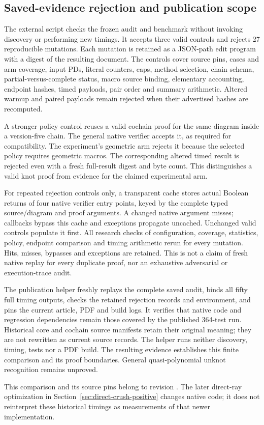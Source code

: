 \subsection{Saved-evidence rejection and publication scope}

The external script 
checks the frozen audit and benchmark without invoking discovery or
performing new timings.  It accepts three valid controls and rejects
27 reproducible mutations.  Each mutation is retained as a JSON-path
edit program with a digest of the resulting document.  The controls
cover source pins, cases and arm coverage, input PDs, literal counters,
caps, method selection, chain schema, partial-versus-complete status,
macro source binding, elementary accounting, endpoint hashes, timed
payloads, pair order and summary arithmetic.  Altered warmup and paired
payloads remain rejected when their advertised hashes are recomputed.

A stronger policy control reuses a valid cochain proof for the same
diagram inside a version-five chain.  The general native verifier
accepts it, as required for compatibility.  The experiment's geometric
arm rejects it because the selected policy requires geometric macros.
The corresponding altered timed result is rejected even with a fresh
full-result digest and byte count.  This distinguishes a valid knot
proof from evidence for the claimed experimental arm.

For repeated rejection controls only, a transparent cache stores actual
Boolean returns of four native verifier entry points, keyed by the
complete typed source/diagram and proof arguments.  A changed native
argument misses; callbacks bypass this cache and exceptions propagate
uncached.  Unchanged valid controls populate it first.  All research
checks of configuration, coverage, statistics, policy, endpoint
comparison and timing arithmetic rerun for every mutation.  Hits,
misses, bypasses and exceptions are retained.  This is not a claim of
fresh native replay for every duplicate proof, nor an exhaustive
adversarial or execution-trace audit.

The publication helper 
freshly replays the complete saved audit, binds all fifty full timing
outputs, checks the retained rejection records and environment, and
pins the current article, PDF and build logs.  It verifies that native
code and regression dependencies remain those covered by the published
364-test run.  Historical core and cochain source manifests retain
their original meaning; they are not rewritten as current source
records.  The helper runs neither discovery, timing, tests nor a PDF
build.  The resulting evidence establishes this finite comparison
and its proof boundaries.  General quasi-polynomial unknot recognition
remains unproved.

This comparison and its source pins belong to revision .
The later direct-ray optimization in Section~\ref{sec:direct-crush-positive}
changes native code; it does not reinterpret these historical timings as
measurements of that newer implementation.
